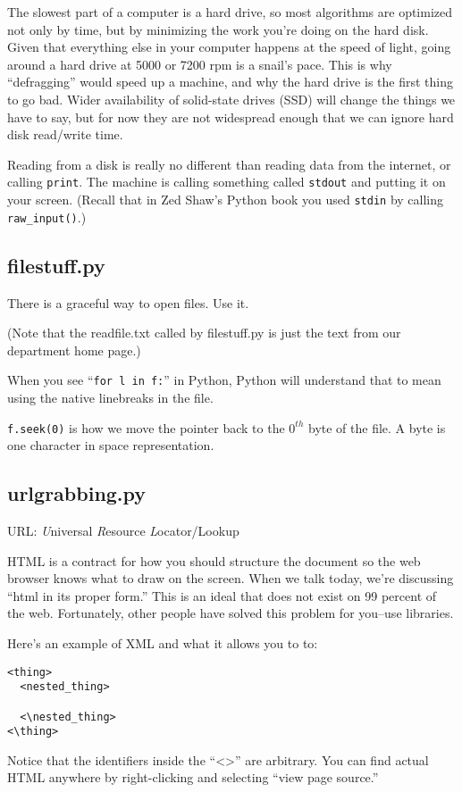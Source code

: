 \documentclass[12pt,letter]{article}
\begin{document}
The slowest part of a computer is a hard drive, so most algorithms are
optimized not only by time, but by minimizing the work you're doing on
the hard disk. Given that everything else in your computer happens at
the speed of light, going around a hard drive at 5000 or 7200 rpm is a
snail's pace. This is why ``defragging'' would speed up a machine, and
why the hard drive is the first thing to go bad. Wider availability of
solid-state drives (SSD) will change the things we have to say, but
for now they are not widespread enough that we can ignore hard disk
read/write time. 


Reading from a disk is really no different than reading data from the
internet, or calling \texttt{print}. The machine is calling something
called \texttt{stdout} and putting it on your screen. (Recall that in
Zed Shaw's Python book you used \texttt{stdin} by calling
\texttt{raw\_input()}.)

\subsection{filestuff.py}
There is a graceful way to open files. Use it. 

(Note that the readfile.txt called by filestuff.py is just the text
from our department home page.) 

When you see ``\texttt{for l in f:}'' in Python, Python will
understand that to mean using the native linebreaks in the file. 

\texttt{f.seek(0)} is how we move the pointer back to the $0^{th}$
byte of the file. A byte is one character in space representation. 

\subsection{urlgrabbing.py}
URL: \emph{U}niversal \emph{R}esource \emph{L}ocator/Lookup

HTML is a contract for how you should structure the document so the
web browser knows what to draw on the screen. When we talk today,
we're discussing ``html in its proper form.'' This is an ideal that
does not exist on 99 percent of the web. Fortunately, other people
have solved this problem for you--use libraries.

Here's an example of XML and what it allows you to to:
\begin{verbatim}
<thing>
  <nested_thing>

  <\nested_thing>
<\thing>
\end{verbatim}
Notice that the identifiers inside the ``<>'' are arbitrary. You can
find actual HTML anywhere by right-clicking and selecting ``view page
source.''
\end{document}
